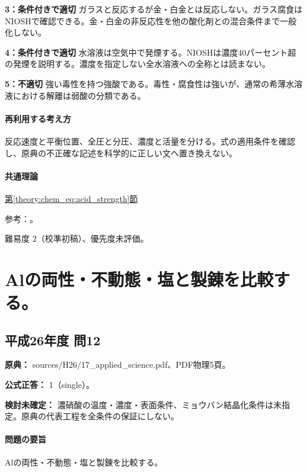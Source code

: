 \noindent\textbf{3：条件付きで適切} ガラスと反応するが金・白金とは反応しない。ガラス腐食はNIOSHで確認できる。金・白金の非反応性を他の酸化剤との混合条件まで一般化しない。\par

\noindent\textbf{4：条件付きで適切} 水溶液は空気中で発煙する。NIOSHは濃度40パーセント超の発煙を説明する。濃度を指定しない全水溶液への全称とは読まない。\par

\noindent\textbf{5：不適切} 強い毒性を持つ強酸である。毒性・腐食性は強いが、通常の希薄水溶液における解離は弱酸の分類である。\par

\paragraph{再利用する考え方} 反応速度と平衡位置、全圧と分圧、濃度と活量を分ける。式の適用条件を確認し、原典の不正確な記述を科学的に正しい文へ置き換えない。

\paragraph{共通理論} \hyperref[theory:chem_eq:acid_strength]{第\ref*{theory:chem_eq:acid_strength}節}

\par 参考：\cite{purdue_acid_strength,niosh_hf}。

\par 難易度 2（校準初稿）、優先度未評価。

\section{Alの両性・不動態・塩と製錬を比較する。}

\subsection{平成26年度 問12}
\label{q:h26-reg-applied-12}

\noindent\textbf{原典：} sources/H26/17\_applied\_science.pdf、PDF物理5頁。

\textbf{公式正答：} 1（single）。

\par\textbf{検討未確定：} 濃硝酸の温度・濃度・表面条件、ミョウバン結晶化条件は未指定。原典の代表工程を全条件の保証にしない。

\paragraph{問題の要旨} Alの両性・不動態・塩と製錬を比較する。

